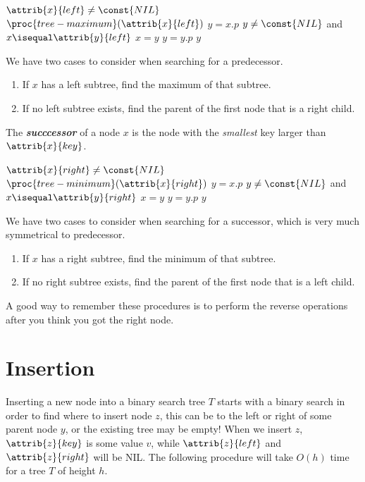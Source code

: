 \documentclass{article}
\begin{document}
\begin{codebox}
\li \If $\attrib{x}{left} \neq \const{NIL}$
\li \Then
        \Return $\proc{tree-maximum}(\attrib{x}{left})$
    \End
\li $y = x.p$
\li \While $y \neq \const{NIL}$ and $x \isequal \attrib{y}{left}$
    \Do
        \li $x = y$ 
        \li $y = y.p$
    \End
\li \Return $y$
\end{codebox}

We have two cases to consider when searching for a predecessor.

\begin{enumerate}
    \item If $x$ has a left subtree, find the maximum of that subtree.
    \item If no left subtree exists, find the parent of the first node that is a right child.
\end{enumerate}

The \textbf{\emph{succcessor}} of a node $x$ is the node with the \textit{smallest} key larger than $\attrib{x}{key}$. 

\begin{codebox}
\li \If $\attrib{x}{right} \neq \const{NIL}$
\li \Then
        \Return $\proc{tree-minimum}(\attrib{x}{right})$
    \End
\li $y = x.p$
\li \While $y \neq \const{NIL}$ and $x \isequal \attrib{y}{right}$
    \Do
        \li $x = y$ 
        \li $y = y.p$
    \End
\li \Return $y$
\end{codebox}

We have two cases to consider when searching for a successor, which is very much symmetrical to predecessor.

\begin{enumerate}
    \item If $x$ has a right subtree, find the minimum of that subtree.
    \item If no right subtree exists, find the parent of the first node that is a left child.
\end{enumerate}

A good way to remember these procedures is to perform the reverse operations after you think you got the right node.

\newpage

\section*{Insertion}
Inserting a new node into a binary search tree $T$ starts with a binary search in order to find where to insert node $z$, this can be to the left or right of some parent node $y$, or the existing tree may be empty! When we insert $z$, $\attrib{z}{key}$ is some value $v$, while $\attrib{z}{left}$ and $\attrib{z}{right}$ will be NIL. The following procedure will take $O(h)$ time for a tree $T$ of height $h$.
\end{document}
